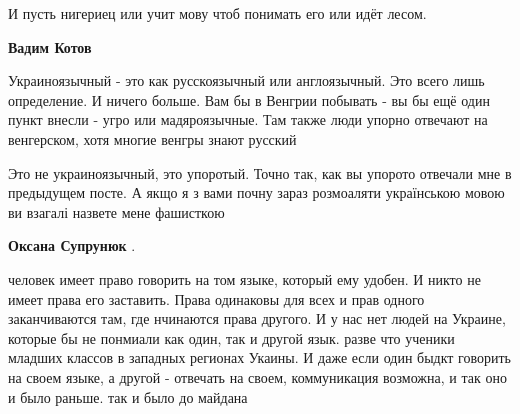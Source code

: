 \begin{itemize}
И пусть нигериец или учит мову чтоб
понимать его или идёт лесом.

\begin{itemize}
 
\textbf{Вадим Котов} 

Украиноязычный - это как русскоязычный или англоязычный. Это всего лишь
определение. И ничего больше. Вам бы в Венгрии побывать - вы бы ещё один пункт
внесли - угро или мадяроязычные. Там также люди упорно отвечают на венгерском,
хотя многие венгры знают русский



 

Это не украиноязычный, это упоротый. Точно так, как вы упорото отвечали мне в
предыдущем посте. А якщо я з вами почну зараз розмоаляти українською мовою ви
взагалі назвете мене фашисткою


 
\textbf{Оксана Супрунюк} . 

человек имеет право говорить на том языке, который ему удобен. И никто не имеет
права его заставить. Права одинаковы для всех и прав одного заканчиваются там,
где нчинаются права другого. И у нас нет людей на Украине, которые бы не
понмиали как один, так и другой язык. разве что ученики младших классов в
западных регионах Укаины. И даже если один быдкт говорить на своем языке, а
другой - отвечать на своем, коммуникация возможна, и так оно и было раньше. так
и было до майдана


 

\end{itemize}
\end{itemize}
